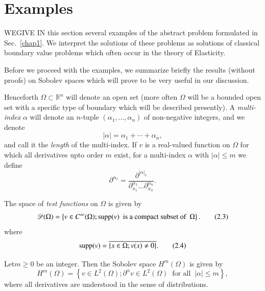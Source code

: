 
\chapter{Examples}\label{chap2}

WE\pageoriginale GIVE IN this section several examples of the abstract
problem formulated in Sec.~\ref{chap1}. We interpret the solutions of these
problems as solutions of classical boundary value problems which often
occur in the theory of Elasticity.

Before we proceed with the examples, we summarize briefly the results
(without proofs) on Sobolev spaces which will prove to be very useful
in our discussion.

Henceforth $\Omega\subset \mathbb{R}^{n}$ will denote an open set
(more often $\Omega$ will be a bounded open set with a specific type
of boundary which will be described presently). A {\em multi-index}
$\alpha$ will denote an $n$-tuple $(\alpha_{1},\ldots,\alpha_{n})$ of
non-negative integers, and we denote 
\begin{equation*}
|\alpha|=\alpha_{1}+\cdots+\alpha_{n},\tag{2.1}\label{chap2-eq2.1} 
\end{equation*}
and call it the {\em length} of the multi-index. If $v$ is a
real-valued function on $\Omega$ for which all derivatives upto order
$m$ exist, for a multi-index $\alpha$ with $|\alpha|\leq m$ we define
\begin{equation*}
\partial^{\alpha_{v}}=\frac{\partial^{|\alpha|_{v}}}{\partial^{\alpha_{1}}_{x_{1}}\ldots
  \partial^{\alpha_{n}}_{x_{n}}}. \tag{2.2}\label{chap2-eq2.2}
\end{equation*}

The space of {\em test functions} on $\Omega$ is given by
\begin{equation*}
\mathscr{D}(\Omega)=\left\{v\in C^{\infty}(\Omega);\operatorname{supp}(v)\text{~ is
  a compact subset of~ }\Omega\right\}.\tag{2.3}\label{chap2-eq2.3}
\end{equation*}
where
\begin{equation*}
\operatorname{supp} (v)=\overline{\{x\in\Omega; v(x)\neq
  0\}}.\tag{2.4}\label{chap2-eq2.4} 
\end{equation*}

\begin{definition}\label{chap2-def2.1}
Let\pageoriginale $m\geq 0$ be an integer. Then the Sobolev space
$H^{m}(\Omega)$ is given by
\begin{equation*}
H^{m}(\Omega)=\left\{v\in L^{2}(\Omega);\partial^{\alpha}v\in
L^{2}(\Omega)~\text{ for all }~ |\alpha|\leq
  m\right\},\tag{2.5}\label{chap2-eq2.5} 
\end{equation*}
where all derivatives are understood in the sense of distributions.
\end{definition}

